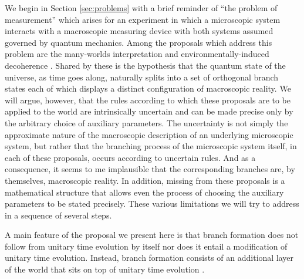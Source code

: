 \documentclass[twocolumn,amsmath,amssymb]{revtex4-1}
\begin{document}
We begin in Section \ref{sec:problems} with a brief reminder of ``the problem of measurement''
which arises for an experiment
in which a microscopic system interacts with a macroscopic measuring device 
with both systems assumed governed by quantum mechanics.
Among the proposals which address this problem
are the many-worlds interpretation \cite{Everett, DeWitt} and
environmentally-induced decoherence \cite{Zeh, Zurek, Zurek1, Zurek2, Wallace, Riedel}. 
Shared by these is the hypothesis that the quantum state of the universe,
as time goes along, naturally splits into a set of orthogonal branch states each of which displays
a distinct configuration of macroscopic reality.
We will argue, however, that the rules according to which these proposals 
are to be applied to the world are intrinsically uncertain
and can be made precise only by the arbitrary choice of auxiliary parameters.
The uncertainty is not simply the approximate nature of the macroscopic
description of an underlying microscopic system, but rather that
the branching process of the microscopic system itself, in each of these proposals, occurs
according to uncertain rules.
And as a consequence, it seems to me
implausible that the corresponding branches are, by themselves, macroscopic reality.
In addition, missing from these proposals is a mathematical structure
that allows even the process of choosing the auxiliary parameters to be stated precisely.
These various limitations we will try to address in a sequence of several steps.

A main feature of the proposal we present here
is that branch formation does not follow from unitary time
evolution by itself nor does it 
entail a modification of unitary time evolution.
Instead, branch formation consists of an additional layer
of the world that sits on top of unitary time evolution \cite{Weingarten}.
\end{document}
